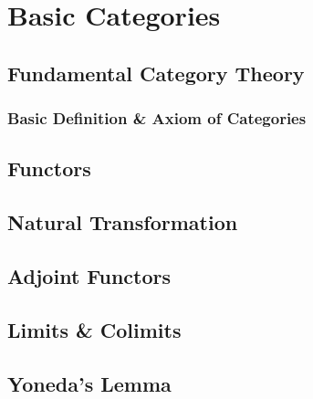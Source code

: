 \documentclass[12pt, a3paper, openany]{book}
\begin{document}
\chapter{Basic Categories}
\headrule
\startcontents
{}

\section{Fundamental Category Theory}
\subsection{Basic Definition \& Axiom of Categories}
\begin{Lem}
    
\end{Lem}
\section{Functors}
\section{Natural Transformation}
\section{Adjoint Functors}
\section{Limits \& Colimits}
\section{Yoneda's Lemma}
\end{document}
